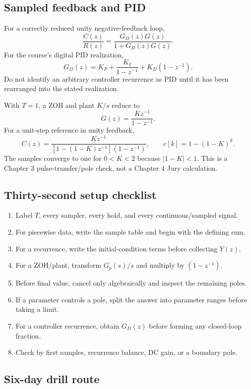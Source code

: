 \documentclass[10pt]{article}
\begin{document}
\subsection{Sampled feedback and PID}

For a correctly reduced unity negative-feedback loop,
\[
\frac{C(z)}{R(z)}=\frac{G_D(z)G(z)}{1+G_D(z)G(z)}.
\]
For the course's digital PID realization,
\[
G_D(z)=K_P+\frac{K_I}{1-z^{-1}}+K_D(1-z^{-1}).
\]
Do not identify an arbitrary controller recurrence as PID until it has been rearranged into the stated realization.

With $T=1$, a ZOH and plant $K/s$ reduce to
\[
G(z)=\frac{Kz^{-1}}{1-z^{-1}}.
\]
For a unit-step reference in unity feedback,
\[
C(z)=\frac{Kz^{-1}}{[1-(1-K)z^{-1}](1-z^{-1})},
\qquad c[k]=1-(1-K)^k.
\]
The samples converge to one for $0<K<2$ because $|1-K|<1$. This is a Chapter 3 pulse-transfer/pole check, not a Chapter 4 Jury calculation.

\subsection{Thirty-second setup checklist}

\begin{enumerate}
  \item Label $T$, every sampler, every hold, and every continuous/sampled signal.
  \item For piecewise data, write the sample table and begin with the defining sum.
  \item For a recurrence, write the initial-condition terms before collecting $Y(z)$.
  \item For a ZOH/plant, transform $G_p(s)/s$ and multiply by $(1-z^{-1})$.
  \item Before final value, cancel only algebraically and inspect the remaining poles.
  \item If a parameter controls a pole, split the answer into parameter ranges before taking a limit.
  \item For a controller recurrence, obtain $G_D(z)$ before forming any closed-loop fraction.
  \item Check by first samples, recurrence balance, DC gain, or a boundary pole.
\end{enumerate}

\subsection{Six-day drill route}
\end{document}
